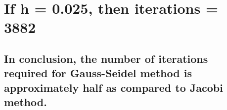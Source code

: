 \documentclass[11pt]{article}
\begin{document}
\hypertarget{if-h-0.025-then-iterations-3882}{%
\section{If h = 0.025, then iterations =
3882}\label{if-h-0.025-then-iterations-3882}}

    \hypertarget{in-conclusion-the-number-of-iterations-required-for-gauss-seidel-method-is-approximately-half-as-compared-to-jacobi-method.}{%
\subsection{In conclusion, the number of iterations required for
Gauss-Seidel method is approximately half as compared to Jacobi
method.}\label{in-conclusion-the-number-of-iterations-required-for-gauss-seidel-method-is-approximately-half-as-compared-to-jacobi-method.}}


    
    
    
\end{document}
